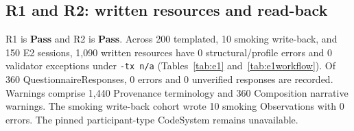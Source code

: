\documentclass[lineno,pdflatex,sn-basic]{sn-jnl}%
\theoremstyle{thmstyleone}%
\theoremstyle{thmstyletwo}%
\theoremstyle{thmstylethree}%
\newcommand{\EOneResources}{1,090}
\newcommand{\EOneErrors}{0}
\newcommand{\EOneValidatorCrashes}{0}
\newcommand{\EOneTemplatedSessions}{200}
\newcommand{\EOneScenarioSessions}{150}
\newcommand{\EOneObservationSessions}{10}
\newcommand{\EOneObservationResources}{10}
\newcommand{\EOneObservationErrors}{0}
\newcommand{\ROneVerdict}{Pass}
\newcommand{\RTwoVerdict}{Pass}
\newcommand{\EOneQuestionnaireResponses}{360}
\newcommand{\EOneQRErrors}{0}
\newcommand{\EOneQRUnverified}{0}
\newcommand{\EOneProvenanceWarnings}{1,440}
\newcommand{\EOneCompositionWarnings}{360}
\begin{document}
\subsection{R1 and R2: written resources and read-back}
R1 is \textbf{\ROneVerdict{}} and R2 is \textbf{\RTwoVerdict{}}.
Across \EOneTemplatedSessions{} templated, \EOneObservationSessions{} smoking write-back,
and \EOneScenarioSessions{} E2 sessions, \EOneResources{} written resources have
\EOneErrors{} structural/profile errors
and \EOneValidatorCrashes{} validator exceptions under \texttt{-tx n/a}
(Tables~\ref{tab:e1} and~\ref{tab:e1workflow}). Of
\EOneQuestionnaireResponses{} QuestionnaireResponses, \EOneQRErrors{} errors and
\EOneQRUnverified{} unverified responses are recorded. Warnings comprise
\EOneProvenanceWarnings{} Provenance terminology and \EOneCompositionWarnings{}
Composition narrative warnings. The smoking write-back cohort wrote
\EOneObservationResources{} smoking Observations with \EOneObservationErrors{} errors.
The pinned participant-type CodeSystem remains unavailable.
\end{document}
